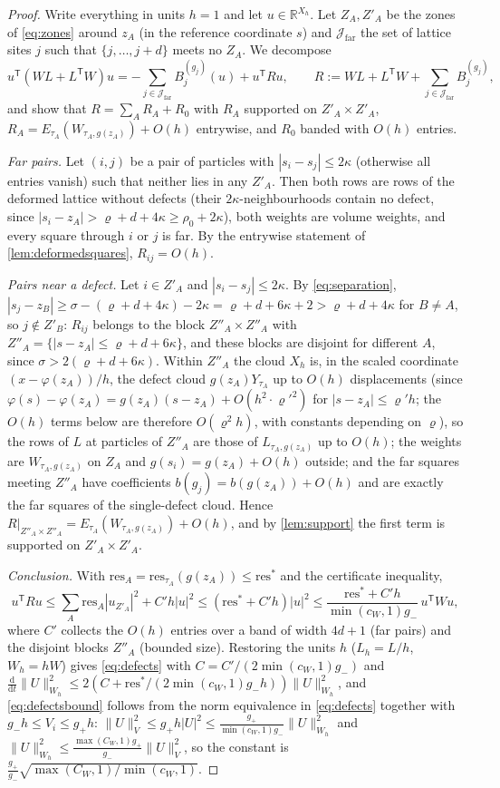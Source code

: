 \documentclass[11pt,a4paper]{article}
\theoremstyle{plain}
\theoremstyle{definition}
\theoremstyle{remark}
\numberwithin{equation}{section}
\newcommand{\R}{\mathbb{R}}
\newcommand{\dd}{\mathrm{d}}
\newcommand{\res}{\mathrm{res}}
\begin{document}
\begin{proof}
Write everything in units $h=1$ and let $u\in\R^{X_h}$. Let $Z_A,Z'_A$ be the zones of \eqref{eq:zones} around $z_A$ (in the reference coordinate $s$) and $\mathcal J_{\mathrm{far}}$ the set of lattice sites $j$ such that $\{j,\dots,j+d\}$ meets no $Z_A$. We decompose
\[
u^{\mathsf T}(WL+L^{\mathsf T}W)u=-\sum_{j\in\mathcal J_{\mathrm{far}}}B_j^{(g_j)}(u)+u^{\mathsf T}Ru,\qquad R:=WL+L^{\mathsf T}W+\sum_{j\in\mathcal J_{\mathrm{far}}}B_j^{(g_j)},
\]
and show that $R=\sum_AR_A+R_0$ with $R_A$ supported on $Z'_A\times Z'_A$, $R_A=E_{\tau_A}(W_{\tau_A,g(z_A)})+O(h)$ entrywise, and $R_0$ banded with $O(h)$ entries.

\emph{Far pairs.} Let $(i,j)$ be a pair of particles with $|s_i-s_j|\le2\kappa$ (otherwise all entries vanish) such that neither lies in any $Z'_A$. Then both rows are rows of the deformed lattice without defects (their $2\kappa$-neighbourhoods contain no defect, since $|s_i-z_A|>\varrho+d+4\kappa\ge\rho_0+2\kappa$), both weights are volume weights, and every square through $i$ or $j$ is far. By the entrywise statement of \cref{lem:deformedsquares}, $R_{ij}=O(h)$.

\emph{Pairs near a defect.} Let $i\in Z'_A$ and $|s_i-s_j|\le2\kappa$. By \eqref{eq:separation}, $|s_j-z_B|\ge\sigma-(\varrho+d+4\kappa)-2\kappa=\varrho+d+6\kappa+2>\varrho+d+4\kappa$ for $B\ne A$, so $j\notin Z'_B$: $R_{ij}$ belongs to the block $Z''_A\times Z''_A$ with $Z''_A=\{|s-z_A|\le\varrho+d+6\kappa\}$, and these blocks are disjoint for different $A$, since $\sigma>2(\varrho+d+6\kappa)$. Within $Z''_A$ the cloud $X_h$ is, in the scaled coordinate $(x-\varphi(z_A))/h$, the defect cloud $g(z_A)Y_{\tau_A}$ up to $O(h)$ displacements (since $\varphi(s)-\varphi(z_A)=g(z_A)(s-z_A)+O(h^2\cdot\varrho'^2)$ for $|s-z_A|\le\varrho'h$; the $O(h)$ terms below are therefore $O(\varrho^2h)$, with constants depending on $\varrho$), so the rows of $L$ at particles of $Z''_A$ are those of $L_{\tau_A,g(z_A)}$ up to $O(h)$; the weights are $W_{\tau_A,g(z_A)}$ on $Z_A$ and $g(s_i)=g(z_A)+O(h)$ outside; and the far squares meeting $Z''_A$ have coefficients $b(g_j)=b(g(z_A))+O(h)$ and are exactly the far squares of the single-defect cloud. Hence $R|_{Z''_A\times Z''_A}=E_{\tau_A}(W_{\tau_A,g(z_A)})+O(h)$, and by \cref{lem:support} the first term is supported on $Z'_A\times Z'_A$.

\emph{Conclusion.} With $\res_A=\res_{\tau_A}(g(z_A))\le\res^*$ and the certificate inequality,
\[
u^{\mathsf T}Ru\le\sum_A\res_A|u_{Z'_A}|^2+C'h|u|^2\le(\res^*+C'h)|u|^2\le\frac{\res^*+C'h}{\min(c_W,1)g_-}\,u^{\mathsf T}Wu ,
\]
where $C'$ collects the $O(h)$ entries over a band of width $4d+1$ (far pairs) and the disjoint blocks $Z''_A$ (bounded size). Restoring the units $h$ ($L_h=L/h$, $W_h=hW$) gives \eqref{eq:defects} with $C=C'/(2\min(c_W,1)g_-)$ and $\frac{\dd}{\dd t}\|U\|_{W_h}^2\le2(C+\res^*/(2\min(c_W,1)g_-h))\|U\|^2_{W_h}$, and \eqref{eq:defectsbound} follows from the norm equivalence in \eqref{eq:defects} together with $g_-h\le V_i\le g_+h$: $\|U\|_V^2\le g_+h|U|^2\le\frac{g_+}{\min(c_W,1)g_-}\|U\|^2_{W_h}$ and $\|U\|^2_{W_h}\le\frac{\max(C_W,1)g_+}{g_-}\|U\|_V^2$, so the constant is $\frac{g_+}{g_-}\sqrt{\max(C_W,1)/\min(c_W,1)}$.
\end{proof}
\end{document}
